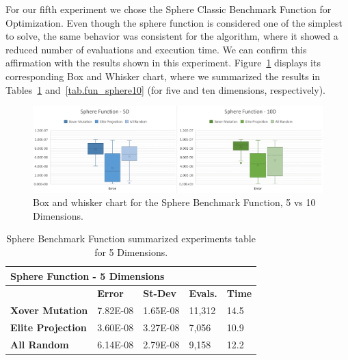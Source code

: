 \documentclass[graybox]{svmult}
\begin{document}
            For our fifth experiment we chose the Sphere Classic Benchmark
            Function for Optimization. Even though the sphere function is
            considered one of the simplest to solve, the same behavior was
            consistent for the algorithm, where it showed a reduced number of
            evaluations and execution time. We can confirm this affirmation
            with the results shown in this experiment.
            Figure~\ref{fig.fun_sphere} displays its corresponding Box and
            Whisker chart, where we summarized the results in
            Tables~\ref{tab.fun_sphere5} and~\ref{tab.fun_sphere10} (for
            five and ten dimensions, respectively).

            \begin{figure}
                \includegraphics[width=0.99\linewidth, frame]{img/fig_fun_sphere.pdf}
                \caption{Box and whisker chart for the Sphere Benchmark Function, 5 vs 10 Dimensions.} \label{fig.fun_sphere}
                \end{figure}

            \begin{table}[]
                \scriptsize
                \centering
                \caption{Sphere Benchmark Function summarized experiments table for 5 Dimensions.}\label{tab.fun_sphere5}
                \begin{tabular}{@{}lllll@{}}
                \toprule
                \multicolumn{5}{l}{\textbf{Sphere Function - 5 Dimensions}} \\ \midrule
                & \textbf{Error} & \textbf{St-Dev} & \textbf{Evals.} & \textbf{Time} \\
                \textbf{Xover Mutation} & 7.82E-08 & 1.65E-08 & 11,312 & 14.5 \\
                \textbf{Elite Projection} & 3.60E-08 & 3.27E-08 & 7,056 & 10.9 \\
                \textbf{All Random} & 6.14E-08 & 2.79E-08 & 9,158 & 12.2 \\ \bottomrule
                \end{tabular}
                \end{table}
\end{document}

